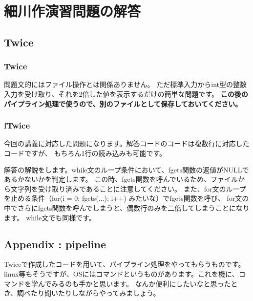\section{細川作演習問題の解答}

\subsection{Twice}
	\subsubsection{Twice}
		問題文的にはファイル操作とは関係ありません。
		ただ標準入力からint型の整数入力を受け取り、それを2倍した値を表示するだけの簡単な問題です。
		\textbf{この後のパイプライン処理で使うので、別のファイルとして保存しておいてください。}
		
		
		\newpage
		
	\subsubsection{fTwice}
		今回の講義に対応した問題になります。解答コードのコードは複数行に対応したコードですが、
		もちろん1行の読み込みも可能です。
		
		解答の解説をします。while文のループ条件において、fgets関数の返値がNULLであるかないかを判定します。
		この時、fgets関数を呼んでいるため、ファイルから文字列を受け取り済みであることに注意してください。
		また、for文のループを止める条件（for(i = 0; fgets(...); i++) みたいな）でfgets関数を呼び、
		for文の中でさらにfgets関数を呼んでしまうと、偶数行のみを二倍してしまうことになります。
		while文でも同様です。

		

\subsection{Appendix : pipeline}
	Twiceで作成したコードを用いて、パイプライン処理をやってもらうものです。
	linux等もそうですが、OSにはコマンドというものがあります。これを機に、コマンドを学んでみるのも手かと思います。
	なんか便利にしたいなと思ったとき、調べたり聞いたりしながらやってみましょう。
